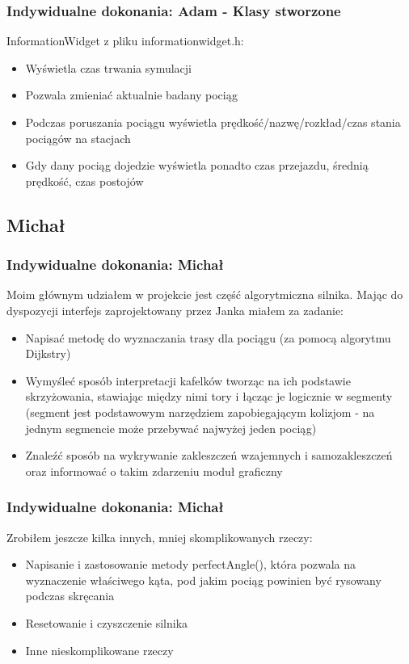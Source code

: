 \documentclass[a4paper, 11pt]{beamer}
\begin{document}
\begin{frame}
\frametitle{Indywidualne dokonania: Adam - Klasy stworzone}
InformationWidget z pliku informationwidget.h:
\begin{itemize}
\item Wyświetla czas trwania symulacji
\item Pozwala zmieniać aktualnie badany pociąg
\item Podczas poruszania pociągu wyświetla prędkość/nazwę/rozkład/czas stania pociągów na stacjach
\item Gdy dany pociąg dojedzie wyświetla ponadto czas przejazdu, średnią prędkość, czas postojów
\end{itemize}
\end{frame}
\subsection{Michał}
\begin{frame}
\frametitle{Indywidualne dokonania: Michał}
Moim głównym udziałem w projekcie jest część algorytmiczna silnika. Mając do dyspozycji interfejs zaprojektowany przez Janka miałem za zadanie:
\begin{itemize}
\item Napisać metodę do wyznaczania trasy dla pociągu (za pomocą algorytmu Dijkstry)
\item Wymyśleć sposób interpretacji kafelków tworząc na ich podstawie skrzyżowania, stawiając między nimi tory i  łącząc je logicznie w segmenty (segment jest podstawowym narzędziem zapobiegającym kolizjom - na jednym segmencie może przebywać najwyżej jeden pociąg)
\item Znaleźć sposób na wykrywanie zakleszczeń wzajemnych i samozakleszczeń oraz informować o takim zdarzeniu moduł graficzny
\end{itemize}
\end{frame}
\begin{frame}
\frametitle{Indywidualne dokonania: Michał}
Zrobiłem jeszcze kilka innych, mniej skomplikowanych rzeczy:
\begin{itemize}
\item Napisanie i zastosowanie metody perfectAngle(), która pozwala na wyznaczenie właściwego kąta, pod jakim pociąg powinien być rysowany podczas skręcania
\item Resetowanie i czyszczenie silnika
\item Inne nieskomplikowane rzeczy
\end{itemize}
\end{frame}
\end{document}
